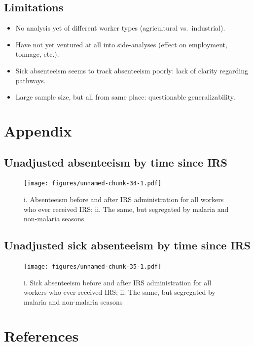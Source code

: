 \documentclass[]{article}
\providecommand{\tightlist}{%
  \setlength{\itemsep}{0pt}\setlength{\parskip}{0pt}}
\begin{document}
\subsection{Limitations}\label{limitations}

\begin{itemize}
\tightlist
\item
  No analysis yet of different worker types (agricultural
  vs.~industrial).
\item
  Have not yet ventured at all into side-analyses (effect on employment,
  tonnage, etc.).
\item
  Sick absenteeism seems to track absenteeism poorly: lack of clarity
  regarding pathways.
\item
  Large sample size, but all from same place: questionable
  generalizability.
\end{itemize}

\newpage

\section{Appendix}\label{appendix}

\subsection{Unadjusted absenteeism by time since
IRS}\label{unadjusted-absenteeism-by-time-since-irs}

\begin{figure}
\centering
\texttt{[image: figures/unnamed-chunk-34-1.pdf]}
\caption{i. Absenteeism before and after IRS administration for all
workers who ever received IRS; ii. The same, but segregated by malaria
and non-malaria seasons}
\end{figure}

\subsection{Unadjusted sick absenteeism by time since
IRS}\label{unadjusted-sick-absenteeism-by-time-since-irs}

\begin{figure}
\centering
\texttt{[image: figures/unnamed-chunk-35-1.pdf]}
\caption{i. Sick absenteeism before and after IRS administration for all
workers who ever received IRS; ii. The same, but segregated by malaria
and non-malaria seasons}
\end{figure}

\section*{References}\label{references}
\end{document}
